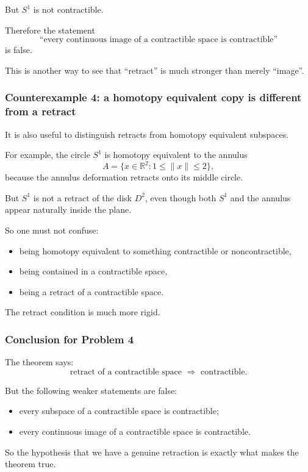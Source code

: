 \documentclass[12pt,a4paper]{article}
\theoremstyle{notespace}
\begin{document}
But \(S^1\) is not contractible.

Therefore the statement
\[
\text{``every continuous image of a contractible space is contractible''}
\]
is false.

This is another way to see that ``retract'' is much stronger than merely ``image''.

\subsubsection{Counterexample 4: a homotopy equivalent copy is different from a retract}

It is also useful to distinguish retracts from homotopy equivalent subspaces.

For example, the circle \(S^1\) is homotopy equivalent to the annulus
\[
A=\{x\in\mathbb{R}^2:1\le \|x\|\le 2\},
\]
because the annulus deformation retracts onto its middle circle.

But \(S^1\) is not a retract of the disk \(D^2\), even though both \(S^1\) and the annulus appear naturally inside the plane.

So one must not confuse:

\begin{itemize}
	\item being homotopy equivalent to something contractible or noncontractible,
	\item being contained in a contractible space,
	\item being a retract of a contractible space.
\end{itemize}

The retract condition is much more rigid.

\subsubsection{Conclusion for Problem 4}

The theorem says:
\[
\text{retract of a contractible space } \Longrightarrow \text{ contractible}.
\]

But the following weaker statements are false:

\begin{itemize}
	\item every subspace of a contractible space is contractible;
	\item every continuous image of a contractible space is contractible.
\end{itemize}

So the hypothesis that we have a genuine retraction is exactly what makes the theorem true.
\end{document}
